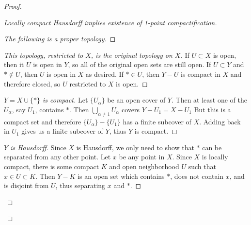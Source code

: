 \begin{proof}
\begin{proof}[Locally compact Hausdorff implies existence of 1-point compactification]
\begin{proof}[The following is a proper topology]
	\end{proof}
	\begin{proof}[This topology, restricted to $X$, is the original topology on $X$]
		
		If $U\subset X$ is open, then it $U$ is open in $Y$, so all of the original open sets are still open.  If $U\subset Y$ and $\ast\notin U$, then $U$ is open in $X$ as desired.  If $\ast\in U$, then $Y{-}U$ is compact in $X$ and therefore closed, so $U$ restricted to $X$ is open.
		
		
		
	\end{proof}
	
	\begin{proof}[$Y=X\cup\{\ast\}$ is compact]

		Let $\{U_\alpha\}$ be an open cover of $Y$.  Then at least one of the $U_\alpha$, say $U_1$, contains $\ast$.  Then $\bigcup\limits_{\alpha\neq 1} U_\alpha$ covers $Y{-}U_1=X{-}U_1$  But this is a compact set and therefore $\{U_\alpha\}{-}\{U_1\}$ has a finite subcover of $X$.  Adding back in $U_1$ gives us a finite subcover of $Y$, thus $Y$ is compact.




	\end{proof}
	\begin{proof}[$Y$ is Hausdorff]
		Since $X$ is Hausdorff, we only need to show that $\ast$ can be separated from any other point.  Let $x$ be any point in $X$.  Since $X$ is locally compact, there is some compact $K$ and open neighborhood $U$ such that $x\in U\subset K$.  Then $Y{-}K$ is an open set which contains $\ast$, does not contain $x$, and is disjoint from $U$, thus separating $x$ and $\ast$.
	\end{proof}
	
	
\end{proof}
\end{proof}